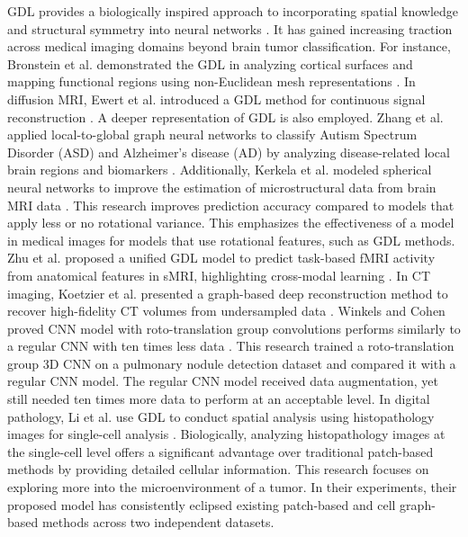 GDL provides a biologically inspired approach to incorporating spatial knowledge and structural symmetry into neural networks \cite{19,20,21}. It has gained increasing traction across medical imaging domains beyond brain tumor classification. For instance, Bronstein et al. demonstrated the GDL in analyzing cortical surfaces and mapping functional regions using non-Euclidean mesh representations \cite{22}. In diffusion MRI, Ewert et al. introduced a GDL method for continuous signal reconstruction \cite{23}. A deeper representation of GDL is also employed. Zhang et al. applied local-to-global graph neural networks to classify Autism Spectrum Disorder (ASD) and Alzheimer's disease (AD) by analyzing disease-related local brain regions and biomarkers \cite{24}. Additionally, Kerkela et al. modeled spherical neural networks to improve the estimation of microstructural data from brain MRI data \cite{25}. This research improves prediction accuracy compared to models that apply less or no rotational variance. This emphasizes the effectiveness of a model in medical images for models that use rotational features, such as GDL methods. Zhu et al. proposed a unified GDL model to predict task-based fMRI activity from anatomical features in sMRI, highlighting cross-modal learning \cite{26}. In CT imaging, Koetzier et al. presented a graph-based deep reconstruction method to recover high-fidelity CT volumes from undersampled data \cite{27}. Winkels and Cohen proved CNN model with roto-translation group convolutions performs similarly to a regular CNN with ten times less data \cite{28}. This research trained a roto-translation group 3D CNN on a pulmonary nodule detection dataset and compared it with a regular CNN model. The regular CNN model received data augmentation, yet still needed ten times more data to perform at an acceptable level. In digital pathology, Li et al. use GDL to conduct spatial analysis using histopathology images for single-cell analysis \cite{29}. Biologically, analyzing histopathology images at the single-cell level offers a significant advantage over traditional patch-based methods by providing detailed cellular information. This research focuses on exploring more into the microenvironment of a tumor. In their experiments, their proposed model has consistently eclipsed existing patch-based and cell graph-based methods across two independent datasets.

